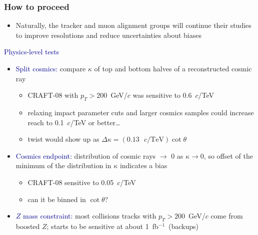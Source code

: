\documentclass[compress]{beamer}
\begin{document}
\begin{frame}
\frametitle{How to proceed}
\begin{itemize}
\item Naturally, the tracker and muon alignment groups will continue
  their studies to improve resolutions and reduce uncertainties about biases
\end{itemize}

\vspace{0.2 cm}
\hspace{-0.83 cm} \textcolor{darkblue}{\large Physics-level tests}

\begin{itemize}
\item \textcolor{darkblue}{Split cosmics:} compare $\kappa$ of top and
  bottom halves of a reconstructed cosmic ray
\begin{itemize}
\item CRAFT-08 with $p_T > 200$~GeV/$c$ was sensitive to 0.6~$c$/TeV
\item relaxing impact parameter cuts and larger cosmics samples could
  increase reach to 0.1~$c$/TeV or better\ldots
\item twist would show up as $\Delta \kappa = (0.13\mbox{ $c$/TeV}) \cot\theta$
\end{itemize}

\item \textcolor{darkblue}{Cosmics endpoint:} distribution of cosmic
  rays $\to$ 0 as $\kappa \to 0$, so offset of the minimum of the
  distribution in $\kappa$ indicates a bias
\begin{itemize}
\item CRAFT-08 sensitive to 0.05~$c$/TeV
\item can it be binned in $\cot\theta$?
\end{itemize}

\item \textcolor{darkblue}{$Z$ mass constraint:} most collisions
  tracks with $p_T > 200$~GeV/$c$ come from boosted $Z$; starts to be sensitive at about \mbox{1~fb$^{-1}$ (backups)\hspace{-1 cm}}
\end{itemize}
\end{frame}
\end{document}
